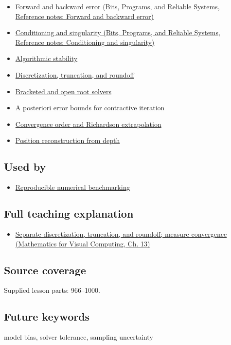 \begin{itemize}
\tightlist
\item
  \href{../01-Bits-Programs-and-Reliable-Systems/main.pdf\#nameddest=appendix-a7fbaf6d1b1c}{Forward and backward error (Bits, Programs, and Reliable Systems, Reference notes: Forward and backward error)}
\item
  \href{../01-Bits-Programs-and-Reliable-Systems/main.pdf\#nameddest=appendix-8f6a01f284a7}{Conditioning and singularity (Bits, Programs, and Reliable Systems, Reference notes: Conditioning and singularity)}
\item
  \hyperref[appendix-aa2bf0d79639]{Algorithmic stability}
\item
  \hyperref[appendix-6b0648b2b8e8]{Discretization, truncation, and roundoff}
\item
  \hyperref[appendix-f63eb850796d]{Bracketed and open root solvers}
\item
  \hyperref[appendix-d83b0ad1be7f]{A posteriori error bounds for contractive iteration}
\item
  \hyperref[appendix-aca80b6bf17a]{Convergence order and Richardson extrapolation}
\item
  \hyperref[appendix-2cbf2968e866]{Position reconstruction from depth}
\end{itemize}

\subsection{Used by}\label{appendix-31b8c295e05f-used-by}

\begin{itemize}
\tightlist
\item
  \hyperref[appendix-b9db93e28371]{Reproducible numerical benchmarking}
\end{itemize}

\subsection{Full teaching explanation}\label{appendix-31b8c295e05f-full-teaching-explanation}

\begin{itemize}
\tightlist
\item
  \href{../02-Mathematics-for-Visual-Computing/main.pdf\#nameddest=02-foundations-ii-ch029-separate-discretization-truncation-and-roundoff-measure-convergence}{Separate discretization, truncation, and roundoff; measure convergence (Mathematics for Visual Computing, Ch. 13)}
\end{itemize}

\subsection{Source coverage}\label{appendix-31b8c295e05f-source-coverage}

Supplied lesson parts: 966--1000.

\subsection{Future keywords}\label{appendix-31b8c295e05f-future-keywords}

model bias, solver tolerance, sampling uncertainty
